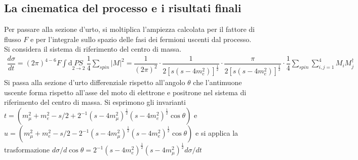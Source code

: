 \documentclass[11pt]{article}
\begin{document}
    \subsection*{La cinematica del processo e i risultati finali}
    Per passare alla sezione d'urto, si moltiplica l'ampiezza calcolata per il fattore di flusso $F$ e per l'integrale sullo spazio delle fasi dei fermioni uscenti dal processo. Si considera il sistema di riferimento del centro di massa.
    \begin{equation}
	\begin{split}
	\dfrac{d\sigma}{dt} = \left(2\pi\right)^{4-6}F \int \mathrm{d}\underset{2\to2}{PS}\ \dfrac{1}{4}\sum_{spin}\lvert M\rvert^2 = \dfrac{1}{\left(2\pi\right)^{2}} \cdot \dfrac{1}{2[s(s-4m_e^2)]^{\frac{1}{2}} } \cdot \dfrac{\pi}{2[s(s-4m_e^2)]^{\frac{1}{2}} }\cdot \dfrac{1}{4}\sum_{spin}\sum_{i,j=1}^{4} M_i M_j^{\dagger}
	\end{split}
	\end{equation}
    Si passa alla sezione d'urto differenziale rispetto all'angolo $\theta$ che l'antimuone uscente forma rispetto all'asse del moto di elettrone e positrone nel sistema di riferimento del centro di massa. Si esprimono gli invarianti $t=(m_\mu^2+m_e^2-s/2+2^{-1}(s-4m_\mu^2)^{\frac{1}{2}}(s-4m_e^2)^{\frac{1}{2}}\cos\theta)$
    e $u=(m_\mu^2+m_e^2-s/2-2^{-1}(s-4m_\mu^2)^{\frac{1}{2}}(s-4m_e^2)^{\frac{1}{2}}\cos\theta)$ e si applica la trasformazione $d\sigma/d\cos\theta=2^{-1}(s-4m_e^2)^{\frac{1}{2}}(s-4m_\mu^2)^{\frac{1}{2}}d\sigma/dt$
\end{document}

